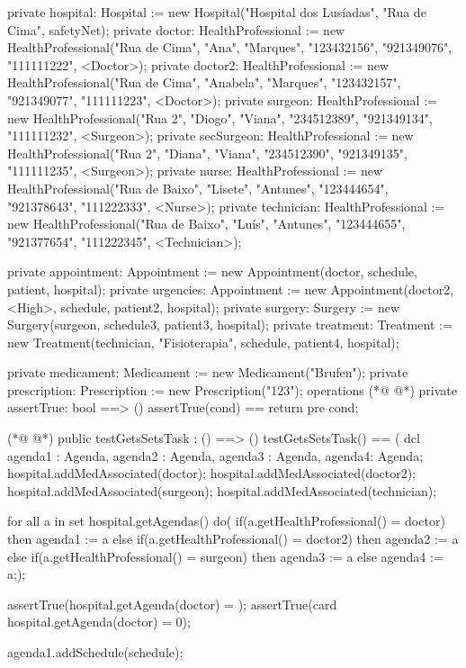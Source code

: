 \begin{vdmpp}[breaklines=true]
  private hospital: Hospital := new Hospital("Hospital dos Lusíadas", "Rua de Cima", safetyNet);
  private doctor: HealthProfessional := new HealthProfessional("Rua de Cima", "Ana", "Marques", "123432156", "921349076", "111111222", <Doctor>);
  private doctor2: HealthProfessional := new HealthProfessional("Rua de Cima", "Anabela", "Marques", "123432157", "921349077", "111111223", <Doctor>);
  private surgeon: HealthProfessional := new HealthProfessional("Rua 2", "Diogo", "Viana", "234512389", "921349134", "111111232", <Surgeon>);
  private secSurgeon: HealthProfessional := new HealthProfessional("Rua 2", "Diana", "Viana", "234512390", "921349135", "111111235", <Surgeon>);
 private nurse: HealthProfessional := new HealthProfessional("Rua de Baixo", "Lisete", "Antunes", "123444654", "921378643", "111222333", <Nurse>);
 private technician: HealthProfessional := new HealthProfessional("Rua de Baixo", "Luís", "Antunes", "123444655", "921377654", "111222345", <Technician>);
 
 private appointment: Appointment := new Appointment(doctor, schedule, patient, hospital);
 private urgencies: Appointment := new Appointment(doctor2, <High>, schedule, patient2, hospital);
 private surgery: Surgery := new Surgery(surgeon, schedule3, patient3, hospital);
 private treatment: Treatment := new Treatment(technician, "Fisioterapia", schedule, patient4, hospital);
 
 private medicament: Medicament := new Medicament("Brufen");
 private prescription: Prescription := new Prescription("123");
operations
(*@
\label{assertTrue:59}
@*)
 private assertTrue: bool ==> ()
  assertTrue(cond) == return
 pre cond;
 
(*@
\label{testGetsSetsTask:63}
@*)
 public testGetsSetsTask : () ==> ()
  testGetsSetsTask() == (
   dcl agenda1 : Agenda, agenda2 : Agenda, agenda3 : Agenda, agenda4: Agenda;
   hospital.addMedAssociated(doctor);
   hospital.addMedAssociated(doctor2);
   hospital.addMedAssociated(surgeon);
   hospital.addMedAssociated(technician);
   
   for all a in set hospital.getAgendas() do(
    if(a.getHealthProfessional() = doctor)
     then agenda1 := a
    else if(a.getHealthProfessional() = doctor2)
     then agenda2 := a
    else if(a.getHealthProfessional() = surgeon)
     then agenda3 := a
    else
     agenda4 := a;);
   
   assertTrue(hospital.getAgenda(doctor) = {});
   assertTrue(card hospital.getAgenda(doctor) = 0);
   
   agenda1.addSchedule(schedule);
   

\end{vdmpp}
